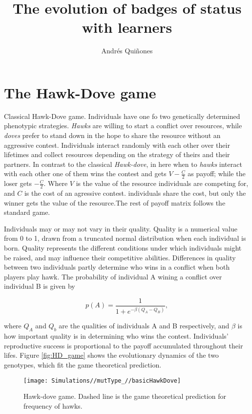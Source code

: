 \documentclass[]{article}
\title{The evolution of badges of status with learners}
\author{Andrés Quiñones}
\date{}
\begin{document}
\maketitle

\hypertarget{the-hawk-dove-game}{%
\section{The Hawk-Dove game}\label{the-hawk-dove-game}}

Classical Hawk-Dove game. Individuals have one fo two genetically
determined phenotypic strategies. \emph{Hawks} are willing to start a
conflict over resources, while \emph{doves} prefer to stand down in the
hope to share the resource without an aggressive contest. Individuals
interact randomly with each other over their lifetimes and collect
resources depending on the strategy of theirs and their partners. In
contrast to the classical \emph{Hawk-dove}, in here when to \emph{hawks}
interact with each other one of them wins the contest and gets
\(V-\frac{C}{2}\) as payoff; while the loser gets \(-\frac{C}{2}\).
Where \(V\) is the value of the resource individuals are competing for,
and \(C\) is the cost of an agressive contest. individuals share the
cost, but only the winner gets the value of the resource.The rest of
payoff matrix follows the standard game.

Individuals may or may not vary in their quality. Quality is a numerical
value from 0 to 1, drawn from a truncated normal distribution when each
individual is born. Quality represents the different conditions under
which individuals might be raised, and may influence their competitive
abilities. Differences in quality between two individuals partly
determine who wins in a conflict when both players play hawk. The
probability of individual A wining a conflict over individual B is given
by

\begin{equation}
p(A)=\frac{1}{1+e^{-\beta(Q_A-Q_B)}},
\end{equation}

where \(Q_A\) and \(Q_b\) are the qualities of individuals A and B
respectively, and \(\beta\) is how important quality is in determining
who wins the contest. Individuals' reproductive success is proportional
to the payoff accumulated throughout their lifes. Figure
\ref{fig:HD_game} shows the evolutionary dynamics of the two genotypes,
which fit the game theoretical prediction.

\begin{figure}
\texttt{[image: Simulations//mutType\_//basicHawkDove]} \caption{\label{fig:HD_game}Hawk-dove game. Dashed line is the  game theoretical prediction for frequency of hawks.}\label{fig:fig1}
\end{figure}
\end{document}
